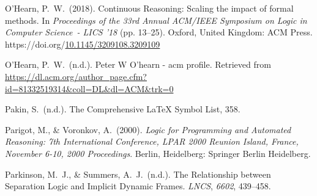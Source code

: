 \documentclass[12pt,twoside]{article}
\begin{document}
{\begin{thebibliography}{222}
\mdbibitemlabel{[P. W. O’Hearn, 2018]}O’Hearn, P.~W.~(2018). Continuous Reasoning: Scaling the impact of formal methods. In \emph{Proceedings of the 33rd Annual ACM/IEEE Symposium on Logic in Computer Science~- LICS ’18} (pp. 13–25). Oxford, United Kingdom: ACM Press. https://doi.org/\href{https://dx.doi.org/10.1145/3209108.3209109}{10.1145/3209108.3209109}\label{ohearn_continuous_2018}%

\mdbibitemlabel{[P. W. O’Hearn, n.d.]}O’Hearn, P.~W.~(n.d.). Peter W O’hearn - acm profile. Retrieved from \href{https://dl.acm.org/author_page.cfm?id=81332519314\%26coll=DL\%26dl=ACM\%26trk=0}{{\ttfamily https://\hspace{0pt}dl.\hspace{0pt}acm.\hspace{0pt}org/\hspace{0pt}author\_\hspace{0pt}page.\hspace{0pt}cfm?\hspace{0pt}id=\hspace{0pt}81332519314\&\hspace{0pt}coll=\hspace{0pt}DL\&\hspace{0pt}dl=\hspace{0pt}ACM\&\hspace{0pt}trk=\hspace{0pt}0}}\label{ohearn_peter_nodate}%

\mdbibitemlabel{[Pakin, n.d.]}Pakin, S.~(n.d.). The Comprehensive LaTeX Symbol List, 358.\label{pakin_comprehensive_nodate}%

Parigot, M., \& Voronkov, A.~(2000). \emph{Logic for Programming and Automated Reasoning: 7th International Conference, LPAR 2000 Reunion Island, France, November 6-10, 2000 Proceedings}. Berlin, Heidelberg: Springer Berlin Heidelberg.\label{parigot_logic_2000}%

Parkinson, M.~J., \& Summers, A.~J.~(n.d.). The Relationship between Separation Logic and Implicit Dynamic Frames. \emph{LNCS}, \emph{6602}, 439–458.\label{parkinson_relationship_nodate}%


\end{thebibliography}}
\end{document}
